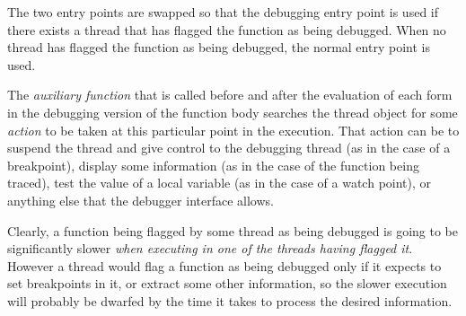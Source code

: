 The two entry points are swapped so that the debugging entry point is
used if there exists a thread that has flagged the function as being
debugged.  When no thread has flagged the function as being debugged,
the normal entry point is used. 

The \emph{auxiliary function} that is called before and after the
evaluation of each form in the debugging version of the function body
searches the thread object for some \emph{action} to be taken at this
particular point in the execution.  That action can be to suspend the
thread and give control to the debugging thread (as in the case of a
breakpoint), display some information (as in the case of the function
being traced), test the value of a local variable (as in the case of a
watch point), or anything else that the debugger interface allows. 

Clearly, a function being flagged by some thread as being debugged is
going to be significantly slower \emph{when executing in one of the
  threads having flagged it}.  However a thread would flag a function
as being debugged only if it expects to set breakpoints in it, or
extract some other information, so the slower execution will probably
be dwarfed by the time it takes to process the desired information. 



